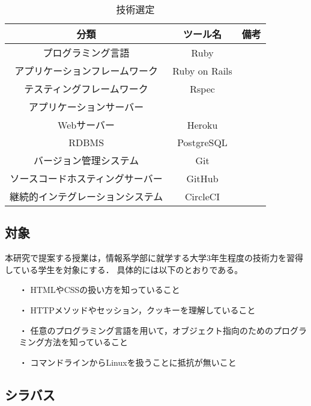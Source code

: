 \begin{table}[ht]
  \begin{center}
    \caption{技術選定}
    \begin{tabular}{|c|c|c|}
      \hline
      分類 & ツール名 & 備考 \\
      \hline
      プログラミング言語 & Ruby & \\
      \hline
      アプリケーションフレームワーク & Ruby on Rails & \\
      \hline
      テスティングフレームワーク & Rspec & \\
      \hline
      アプリケーションサーバー &  & \\
      \cline{1-1}\cline{3-3}
      Webサーバー & Heroku & \\
      \hline
      RDBMS & PostgreSQL & \\
      \hline
      バージョン管理システム & Git & \\
      \hline
      ソースコードホスティングサーバー & GitHub & \\
      \hline
      継続的インテグレーションシステム & CircleCI & \\
      \hline
    \end{tabular}
    \label{tab:技術選定}
  \end{center}
\end{table}

\subsection{対象}

本研究で提案する授業は，情報系学部に就学する大学3年生程度の技術力を習得している学生を対象にする．
具体的には以下のとおりである。

\begin{itemize}
  \item[・] HTMLやCSSの扱い方を知っていること
  \item[・] HTTPメソッドやセッション，クッキーを理解していること
  \item[・] 任意のプログラミング言語を用いて，オブジェクト指向のためのプログラミング方法を知っていること
  \item[・] コマンドラインからLinuxを扱うことに抵抗が無いこと
\end{itemize}

\subsection{シラバス}

